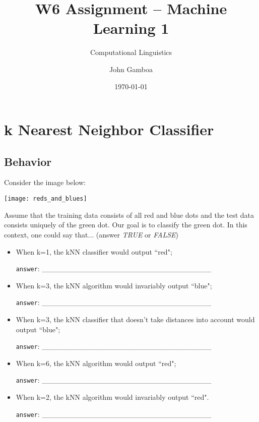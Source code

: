 \documentclass[a4paper,11pt]{scrartcl}
\title{W6 Assignment -- Machine Learning 1}
\subtitle{Computational Linguistics}
\author{John Gamboa}
\date{\today}
\begin{document}
\maketitle

\section{k Nearest Neighbor Classifier}

\subsection{Behavior}

Consider the image below:

\texttt{[image: reds\_and\_blues]}

Assume that the training data consists of all red and blue dots and the test
data consists uniquely of the green dot. Our goal is to classify the green dot.
In this context, one could say that... (answer \textit{TRUE} or \textit{FALSE})

\begin{itemize}
\singlespacing
\item When k=1, the kNN classifier would output ``red";

\verb|answer|: \_\_\_\_\_\_\_\_\_\_\_\_\_\_\_\_\_\_\_\_\_\_\_\_\_\_\_\_\_\_\_\_

\item When k=3, the kNN algorithm would invariably output ``blue";

\verb|answer|: \_\_\_\_\_\_\_\_\_\_\_\_\_\_\_\_\_\_\_\_\_\_\_\_\_\_\_\_\_\_\_\_

\item When k=3, the kNN classifier that doesn't take distances into account
      would output ``blue";

\verb|answer|: \_\_\_\_\_\_\_\_\_\_\_\_\_\_\_\_\_\_\_\_\_\_\_\_\_\_\_\_\_\_\_\_

\item When k=6, the kNN algorithm would output ``red";

\verb|answer|: \_\_\_\_\_\_\_\_\_\_\_\_\_\_\_\_\_\_\_\_\_\_\_\_\_\_\_\_\_\_\_\_

\item When k=2, the kNN algorithm would invariably output ``red".

\verb|answer|: \_\_\_\_\_\_\_\_\_\_\_\_\_\_\_\_\_\_\_\_\_\_\_\_\_\_\_\_\_\_\_\_
\end{itemize}
\end{document}
